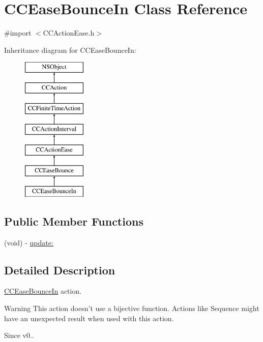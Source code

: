 \hypertarget{interface_c_c_ease_bounce_in}{\section{C\-C\-Ease\-Bounce\-In Class Reference}
\label{interface_c_c_ease_bounce_in}
}


{\ttfamily \#import $<$C\-C\-Action\-Ease.\-h$>$}

Inheritance diagram for C\-C\-Ease\-Bounce\-In\-:\begin{figure}[H]
\begin{center}
\leavevmode
\includegraphics[height=7.000000cm]{interface_c_c_ease_bounce_in}
\end{center}
\end{figure}
\subsection*{Public Member Functions}
\begin{DoxyCompactItemize}
\item 
(void) -\/ \hyperlink{interface_c_c_ease_bounce_in_a8cebc9959536ec089b95d67577c7f85a}{update\-:}
\end{DoxyCompactItemize}


\subsection{Detailed Description}
\hyperlink{interface_c_c_ease_bounce_in}{C\-C\-Ease\-Bounce\-In} action. \begin{DoxyWarning}{Warning}
This action doesn't use a bijective function. Actions like Sequence might have an unexpected result when used with this action. 
\end{DoxyWarning}
\begin{DoxySince}{Since}
v0.. 
\end{DoxySince}


